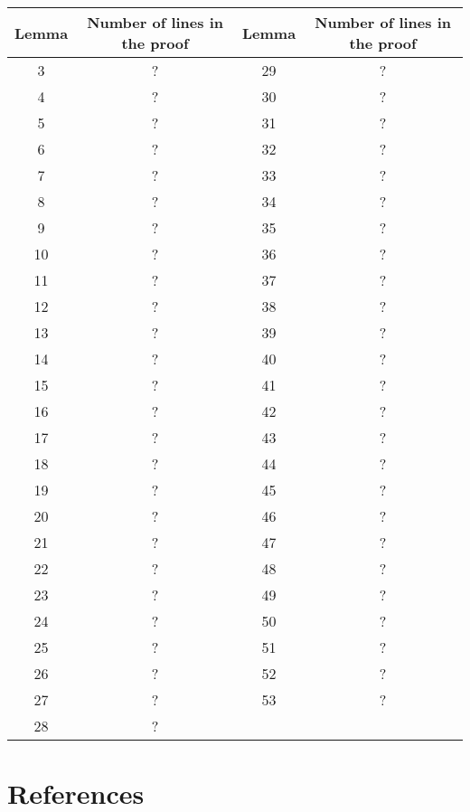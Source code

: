 \documentclass[a4paper]{article}
\begin{document}
\begin{center}
\begin{tabular}{|c|c||c|c|}
\hline Lemma & Number of lines in the proof & Lemma & Number of lines in the proof \\
\hline 3 & ? & 29 & ? \\
\hline 4 & ? & 30 & ? \\
\hline 5 & ? & 31 & ? \\
\hline 6 & ? & 32 & ? \\
\hline 7 & ? & 33 & ? \\
\hline 8 & ? & 34 & ? \\
\hline 9 & ? & 35 & ? \\
\hline 10 & ? & 36 & ? \\
\hline 11 & ? & 37 & ? \\
\hline 12 & ? & 38 & ? \\
\hline 13 & ? & 39 & ? \\
\hline 14 & ? & 40 & ? \\
\hline 15 & ? & 41 & ? \\
\hline 16 & ? & 42 & ? \\
\hline 17 & ? & 43 & ? \\
\hline 18 & ? & 44 & ? \\
\hline 19 & ? & 45 & ? \\
\hline 20 & ? & 46 & ? \\
\hline 21 & ? & 47 & ? \\
\hline 22 & ? & 48 & ? \\
\hline 23 & ? & 49 & ? \\
\hline 24 & ? & 50 & ? \\
\hline 25 & ? & 51 & ? \\
\hline 26 & ? & 52 & ? \\
\hline 27 & ? & 53 & ? \\
\hline 28 & ? & & \\
\hline
\end{tabular}
\end{center}


\section*{References}
\end{document}
